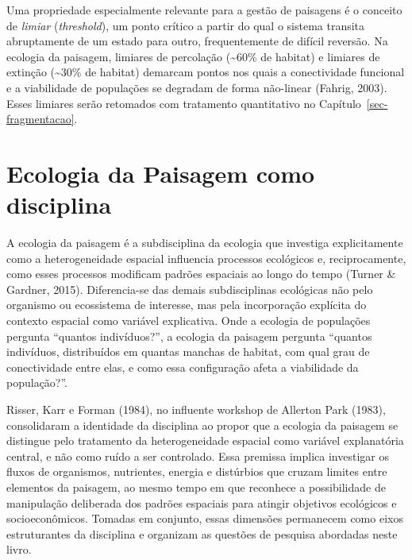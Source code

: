 \documentclass[
  portuguese,
  11pt,
  a4paper,
  open=any]{scrbook}
\begin{document}
\begin{tcolorbox}[enhanced jigsaw, colbacktitle=quarto-callout-note-color!10!white, coltitle=black, opacityback=0, breakable, left=2mm, colback=white, bottomtitle=1mm, toptitle=1mm, titlerule=0mm, arc=.35mm, opacitybacktitle=0.6, leftrule=.75mm, colframe=quarto-callout-note-color-frame, title=\textcolor{quarto-callout-note-color}{\faInfo}\hspace{0.5em}{Limiares e irreversibilidade}, rightrule=.15mm, bottomrule=.15mm, toprule=.15mm]

Uma propriedade especialmente relevante para a gestão de paisagens é o
conceito de \emph{limiar} (\emph{threshold}), um ponto crítico a partir
do qual o sistema transita abruptamente de um estado para outro,
frequentemente de difícil reversão. Na ecologia da paisagem, limiares de
percolação (\textasciitilde60\% de habitat) e limiares de extinção
(\textasciitilde30\% de habitat) demarcam pontos nos quais a
conectividade funcional e a viabilidade de populações se degradam de
forma não-linear (Fahrig, 2003). Esses limiares serão retomados com
tratamento quantitativo no Capítulo~\ref{sec-fragmentacao}.

\end{tcolorbox}

\section{Ecologia da Paisagem como
disciplina}\label{ecologia-da-paisagem-como-disciplina}

A ecologia da paisagem é a subdisciplina da ecologia que investiga
explicitamente como a heterogeneidade espacial influencia processos
ecológicos e, reciprocamente, como esses processos modificam padrões
espaciais ao longo do tempo (Turner \& Gardner, 2015). Diferencia-se das
demais subdisciplinas ecológicas não pelo organismo ou ecossistema de
interesse, mas pela incorporação explícita do contexto espacial como
variável explicativa. Onde a ecologia de populações pergunta ``quantos
indivíduos?'', a ecologia da paisagem pergunta ``quantos indivíduos,
distribuídos em quantas manchas de habitat, com qual grau de
conectividade entre elas, e como essa configuração afeta a viabilidade
da população?''.

Risser, Karr e Forman (1984), no influente workshop de Allerton Park
(1983), consolidaram a identidade da disciplina ao propor que a ecologia
da paisagem se distingue pelo tratamento da heterogeneidade espacial
como variável explanatória central, e não como ruído a ser controlado.
Essa premissa implica investigar os fluxos de organismos, nutrientes,
energia e distúrbios que cruzam limites entre elementos da paisagem, ao
mesmo tempo em que reconhece a possibilidade de manipulação deliberada
dos padrões espaciais para atingir objetivos ecológicos e
socioeconômicos. Tomadas em conjunto, essas dimensões permanecem como
eixos estruturantes da disciplina e organizam as questões de pesquisa
abordadas neste livro.
\end{document}
